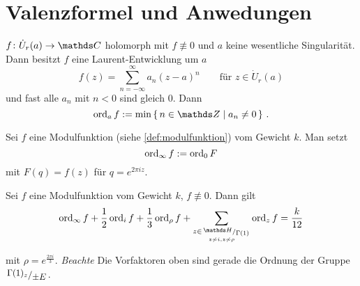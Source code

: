 \section{Valenzformel und Anwedungen}

\begin{erin}
$f\colon \dot{U}_r(a) \ra \CC$ holomorph mit $f\not\equiv 0$ und $a$ keine wesentliche Singularität.
Dann besitzt $f$ eine Laurent-Entwicklung um $a$
\[
	f(z) = \sum_{n=-\infty}^\infty a_n(z-a)^n
	\qquad \text{für } z \in \dot{U}_r(a)
\]
und fast alle $a_n$ mit $n < 0$ sind gleich 0. Dann
\[
	\ord_a f := \min\Set{n \in \ZZ \mid a_n \not= 0}
	\,.
\]
\end{erin}

\begin{defi}
Sei $f$ eine Modulfunktion (siehe \autoref{def:modulfunktion}) vom Gewicht $k$.
Man setzt
\[
	\operatorname{ord}_\infty f := \operatorname{ord}_0 F
\]
mit $F(q) = f(z)$ für $q = e^{2\pi iz}$.
\end{defi}

\begin{satz}[Valenzformel]
Sei $f$ eine Modulfunktion vom Gewicht $k$, $f\not\equiv 0$.
Dann gilt
\[
	\ord_\infty f + \frac{1}{2} \ord_i f + \frac{1}{3} \ord_\rho f + \sum_{\substack{z \in \modulo{\HH}{\Gamma(1)} \\ \scriptscriptstyle z \not\sim i, z\not\sim \rho}} \ord_z f = \frac{k}{12}
\]

mit $\rho = e^{\frac{2\pi i}{3}}$.
\emph{Beachte} Die Vorfaktoren oben sind gerade die Ordnung der Gruppe $\modulo{\Gamma(1)_z}{\pm E}$.
\end{satz}